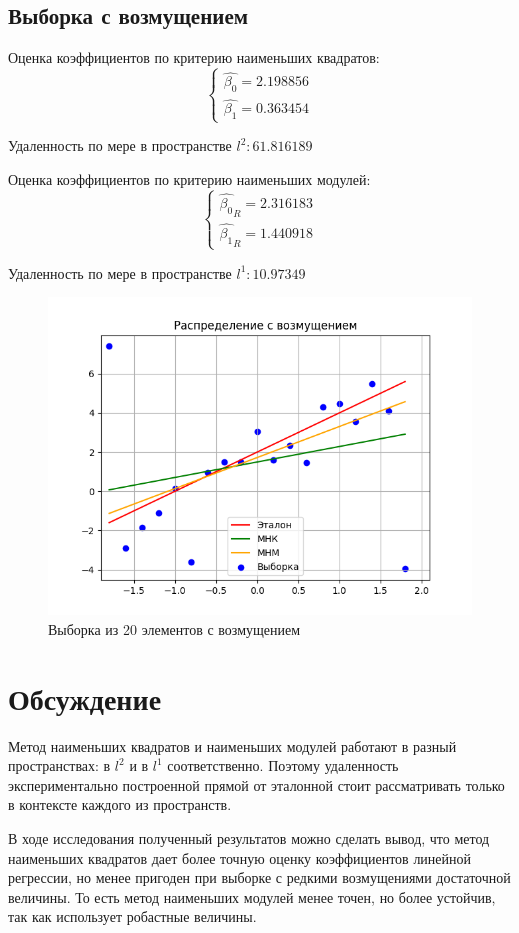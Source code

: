 \documentclass[12pt,a4paper]{article}
\begin{document}
\subsection{Выборка с возмущением}
Оценка коэффициентов по критерию наименьших квадратов:
\begin{equation}
    \left\{
    \begin{array}{ll}
        \hat{\beta_0}=2.198856\\
        \hat{\beta_1}=0.363454
    \end{array}
    \right.
\end{equation}

Удаленность по мере в пространстве $l^2:61.816189$

Оценка коэффициентов по критерию наименьших модулей:
\begin{equation}
    \left\{
    \begin{array}{ll}
        \hat{\beta_0}_R=2.316183\\
        \hat{\beta_1}_R=1.440918
    \end{array}
    \right.
\end{equation}

Удаленность по мере в пространстве $l^1:10.97349$
\begin{figure}[H]
    \centering
    \includegraphics{images/disturbance.png}
    \caption{Выборка из 20 элементов с возмущением}
\end{figure}

\section{Обсуждение}
Метод наименьших квадратов и наименьших модулей работают в разный пространствах: в $l^2$ и в $l^1$ соответственно. Поэтому удаленность экспериментально построенной прямой от эталонной стоит рассматривать только в контексте каждого из пространств.

В ходе исследования полученный результатов можно сделать вывод, что метод наименьших квадратов дает более точную оценку коэффициентов линейной регрессии, но менее пригоден при выборке с редкими возмущениями достаточной величины. То есть метод наименьших модулей менее точен, но более устойчив, так как использует робастные величины.
\end{document}
